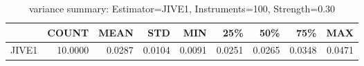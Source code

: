 \begin{table}[ht]
\centering
\caption{variance summary: Estimator=JIVE1, Instruments=100, Strength=0.30}
\begin{tabular}{lrrrrrrrr}
\toprule
 & COUNT & MEAN & STD & MIN & 25\% & 50\% & 75\% & MAX \\
\midrule
JIVE1 & 10.0000 & 0.0287 & 0.0104 & 0.0091 & 0.0251 & 0.0265 & 0.0348 & 0.0471 \\
\bottomrule
\end{tabular}
\end{table}
